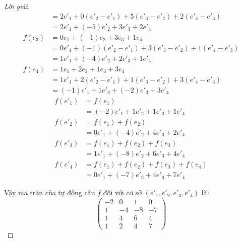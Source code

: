 \documentclass[class=nhvh-linear-algebra,crop=false]{standalone}
\begin{document}
\begin{proof}[Lời giải]
\begin{align*}
                 & = 2e'_{1} + 0(e'_{2} - e'_{1}) + 5(e'_{3} - e'_{2}) + 2(e'_{4} - e'_{3})    \\
                 & = 2e'_{1} + (-5)e'_{2} + 3e'_{3} + 2e'_{4}                                  \\
        f(e_{3}) & = 0e_{1} + (-1)e_{2} + 3e_{3} + 1e_{4}                                      \\
                 & = 0e'_{1} + (-1)(e'_{2} - e'_{1}) + 3(e'_{3} - e'_{2}) + 1(e'_{4} - e'_{3}) \\
                 & = 1e'_{1} + (-4)e'_{2} + 2e'_{3} + 1e'_{4}                                  \\
        f(e_{4}) & = 1e_{1} + 2e_{2} + 1e_{3} + 3e_{4}                                         \\
                 & = 1e'_{1} + 2(e'_{2} - e'_{1}) + 1(e'_{3} - e'_{2}) + 3(e'_{4} - e'_{3})    \\
                 & = (-1)e'_{1} + 1e'_{2} + (-2)e'_{3} + 3e'_{4}
    \end{align*}
    \begin{align*}
        f(e'_{1}) & = f(e_{1})                                  \\
                  & = (-2)e'_{1} + 1e'_{2} + 1e'_{3} + 1e'_{4}  \\
        f(e'_{2}) & = f(e_{1}) + f(e_{2})                       \\
                  & = 0e'_{1} + (-4)e'_{2} + 4e'_{3} + 2e'_{4}  \\
        f(e'_{3}) & = f(e_{1}) + f(e_{2}) + f(e_{3})            \\
                  & = 1e'_{1} + (-8)e'_{2} + 6e'_{3} + 4e'_{4}  \\
        f(e'_{4}) & = f(e_{1}) + f(e_{2}) + f(e_{3}) + f(e_{4}) \\
                  & = 0e'_{1} + (-7)e'_{2} + 4e'_{3} + 7e'_{4}
    \end{align*}
    \par Vậy ma trận của tự đồng cấu $f$ đối với cơ sở $(e'_{1}, e'_{2}, e'_{3}, e'_{4})$ là:
    \[
        \begin{pmatrix}
            -2 & 0  & 1  & 0  \\
            1  & -4 & -8 & -7 \\
            1  & 4  & 6  & 4  \\
            1  & 2  & 4  & 7
        \end{pmatrix}
    \]
\end{proof}
\end{document}
